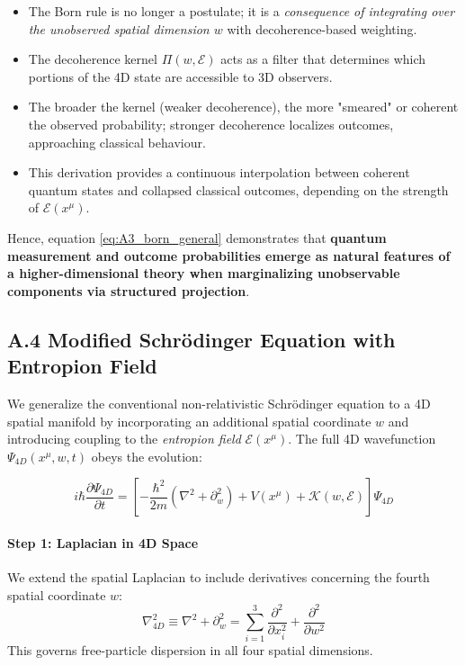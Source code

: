 \documentclass[12pt]{article}
\begin{document}
\begin{itemize}
    \item The Born rule is no longer a postulate; it is a \emph{consequence of integrating over the unobserved spatial dimension \(w\)} with decoherence-based weighting.
    \item The decoherence kernel \(\Pi(w, \mathcal{E})\) acts as a filter that determines which portions of the 4D state are accessible to 3D observers.
    \item The broader the kernel (weaker decoherence), the more "smeared" or coherent the observed probability; stronger decoherence localizes outcomes, approaching classical behaviour.
    \item This derivation provides a continuous interpolation between coherent quantum states and collapsed classical outcomes, depending on the strength of \(\mathcal{E}(x^\mu)\).
\end{itemize}

Hence, equation \eqref{eq:A3_born_general} demonstrates that \textbf{quantum measurement and outcome probabilities emerge as natural features of a higher-dimensional theory when marginalizing unobservable components via structured projection}.



\subsection*{A.4 \quad Modified Schrödinger Equation with Entropion Field}
\label{eq:A4}

We generalize the conventional non-relativistic Schrödinger equation to a 4D spatial manifold by incorporating an additional spatial coordinate \(w\) and introducing coupling to the \emph{entropion field} \(\mathcal{E}(x^\mu)\). The full 4D wavefunction \(\Psi_{4D}(x^\mu, w, t)\) obeys the evolution:

\begin{equation}
i\hbar \frac{\partial \Psi_{4D}}{\partial t} = \left[ -\frac{\hbar^2}{2m}(\nabla^2 + \partial_w^2) + V(x^\mu) + \mathcal{K}(w, \mathcal{E}) \right] \Psi_{4D}
\label{eq:A4_Schrodinger4D}
\end{equation}

\paragraph{Step 1: Laplacian in 4D Space}

We extend the spatial Laplacian to include derivatives concerning the fourth spatial coordinate \(w\):
\begin{equation}
\nabla^2_{4D} \equiv \nabla^2 + \partial_w^2 = \sum_{i=1}^{3} \frac{\partial^2}{\partial x_i^2} + \frac{\partial^2}{\partial w^2}
\end{equation}
This governs free-particle dispersion in all four spatial dimensions.
\end{document}
